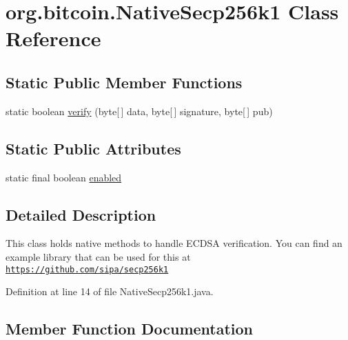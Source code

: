 \hypertarget{classorg_1_1bitcoin_1_1_native_secp256k1}{}\section{org.\+bitcoin.\+Native\+Secp256k1 Class Reference}
\label{classorg_1_1bitcoin_1_1_native_secp256k1}
\subsection*{Static Public Member Functions}
\begin{DoxyCompactItemize}
\item 
static boolean \hyperlink{classorg_1_1bitcoin_1_1_native_secp256k1_a7ff9dbab59c8cff4ce489651f045cd0a}{verify} (byte\mbox{[}$\,$\mbox{]} data, byte\mbox{[}$\,$\mbox{]} signature, byte\mbox{[}$\,$\mbox{]} pub)
\end{DoxyCompactItemize}
\subsection*{Static Public Attributes}
\begin{DoxyCompactItemize}
\item 
static final boolean \hyperlink{classorg_1_1bitcoin_1_1_native_secp256k1_a52e69585bc6f643505a508812f566a7d}{enabled}
\end{DoxyCompactItemize}


\subsection{Detailed Description}
This class holds native methods to handle E\+C\+D\+S\+A verification. You can find an example library that can be used for this at \href{https://github.com/sipa/secp256k1}{\tt https\+://github.\+com/sipa/secp256k1} 

Definition at line 14 of file Native\+Secp256k1.\+java.



\subsection{Member Function Documentation}
\hypertarget{classorg_1_1bitcoin_1_1_native_secp256k1_a7ff9dbab59c8cff4ce489651f045cd0a}{}
